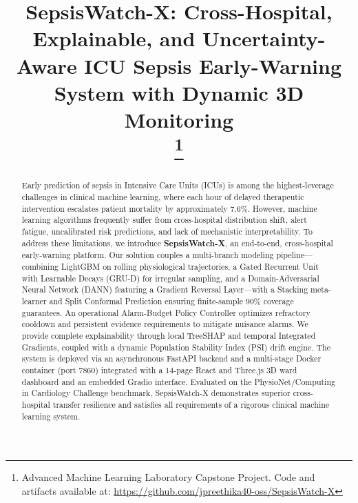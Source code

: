 \documentclass[conference]{IEEEtran}
\begin{document}
\title{SepsisWatch-X: Cross-Hospital, Explainable, and Uncertainty-Aware ICU Sepsis Early-Warning System with Dynamic 3D Monitoring\\
\thanks{Advanced Machine Learning Laboratory Capstone Project. Code and artifacts available at: \url{https://github.com/jpreethika40-oss/SepsisWatch-X}}
}

\author{
}

\maketitle

\begin{abstract}
Early prediction of sepsis in Intensive Care Units (ICUs) is among the highest-leverage challenges in clinical machine learning, where each hour of delayed therapeutic intervention escalates patient mortality by approximately 7.6\%. However, machine learning algorithms frequently suffer from cross-hospital distribution shift, alert fatigue, uncalibrated risk predictions, and lack of mechanistic interpretability. To address these limitations, we introduce \textbf{SepsisWatch-X}, an end-to-end, cross-hospital early-warning platform. Our solution couples a multi-branch modeling pipeline---combining LightGBM on rolling physiological trajectories, a Gated Recurrent Unit with Learnable Decays (GRU-D) for irregular sampling, and a Domain-Adversarial Neural Network (DANN) featuring a Gradient Reversal Layer---with a Stacking meta-learner and Split Conformal Prediction ensuring finite-sample 90\% coverage guarantees. An operational Alarm-Budget Policy Controller optimizes refractory cooldown and persistent evidence requirements to mitigate nuisance alarms. We provide complete explainability through local TreeSHAP and temporal Integrated Gradients, coupled with a dynamic Population Stability Index (PSI) drift engine. The system is deployed via an asynchronous FastAPI backend and a multi-stage Docker container (port 7860) integrated with a 14-page React and Three.js 3D ward dashboard and an embedded Gradio interface. Evaluated on the PhysioNet/Computing in Cardiology Challenge benchmark, SepsisWatch-X demonstrates superior cross-hospital transfer resilience and satisfies all requirements of a rigorous clinical machine learning system.
\end{abstract}
\end{document}
